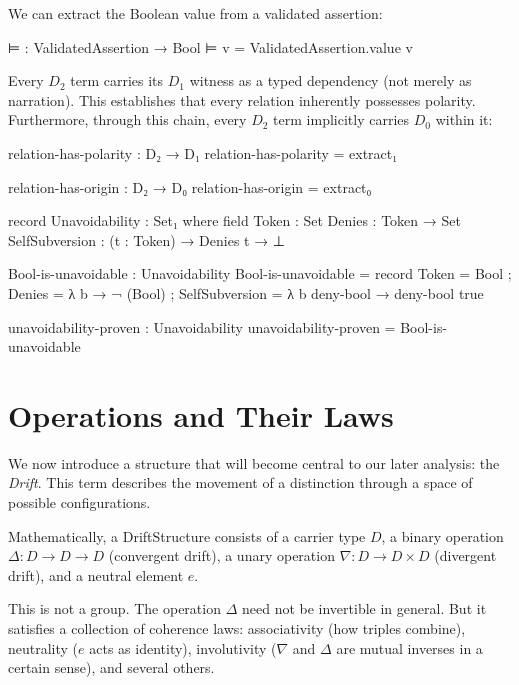 \documentclass[11pt,a4paper]{book}
\begin{document}
We can extract the Boolean value from a validated assertion:

\begin{code}
⊨ : ValidatedAssertion → Bool
⊨ v = ValidatedAssertion.value v

\end{code}

Every $D_2$ term carries its $D_1$ witness as a typed dependency (not merely as narration). 
This establishes that every relation inherently possesses polarity. Furthermore, through 
this chain, every $D_2$ term implicitly carries $D_0$ within it:

\begin{code}
relation-has-polarity : D₂ → D₁
relation-has-polarity = extract₁

relation-has-origin : D₂ → D₀
relation-has-origin = extract₀
\end{code}

\begin{code}
record Unavoidability : Set₁ where
  field
    Token  : Set
    Denies : Token → Set
    SelfSubversion : (t : Token) → Denies t → ⊥

Bool-is-unavoidable : Unavoidability
Bool-is-unavoidable = record
  { Token = Bool
  ; Denies = λ b → ¬ (Bool)
  ; SelfSubversion = λ b deny-bool → 
      deny-bool true
  }

unavoidability-proven : Unavoidability
unavoidability-proven = Bool-is-unavoidable
\end{code}

\section{Operations and Their Laws}

We now introduce a structure that will become central to our later analysis: the 
\emph{Drift}. This term describes the movement of 
a distinction through a space of possible configurations.

Mathematically, a DriftStructure consists of a carrier type $D$, a binary operation 
$\Delta : D \to D \to D$ (convergent drift), a unary operation $\nabla : D \to D \times D$ 
(divergent drift), and a neutral element $e$.

This is not a group. The operation $\Delta$ need not be invertible in general. 
But it satisfies a collection of coherence laws: associativity (how triples combine), 
neutrality ($e$ acts as identity), involutivity ($\nabla$ and $\Delta$ are mutual 
inverses in a certain sense), and several others.
\end{document}
